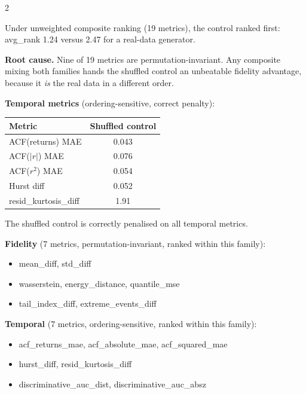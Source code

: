 \documentclass[10pt]{article}
\newcommand{\tealbox}[2]{\begin{tcolorbox}[mybox={Teal}{LBg},title={#1}]#2\end{tcolorbox}}
\begin{document}
\begin{multicols}{2}
{\smallskip
Under unweighted composite ranking (19 metrics), the control ranked first: avg\_rank 1.24 versus 2.47 for a real-data generator.

\textbf{Root cause.} Nine of 19 metrics are permutation-invariant. Any composite mixing both families hands the shuffled control an unbeatable fidelity advantage, because it \emph{is} the real data in a different order.

\textbf{Temporal metrics} (ordering-sensitive, correct penalty):
\begin{tabular}{@{}lc@{}}
\toprule
Metric & Shuffled control \\
\midrule
ACF(returns) MAE    & 0.043 \\
ACF($|r|$) MAE      & 0.076 \\
ACF($r^2$) MAE      & 0.054 \\
Hurst diff          & 0.052 \\
resid\_kurtosis\_diff & 1.91 \\
\bottomrule
\end{tabular}

The shuffled control is correctly penalised on all temporal metrics.}

\columnbreak

\tealbox{Metric Taxonomy}{%
\textbf{Fidelity} (7 metrics, permutation-invariant, ranked within this family):
\begin{itemize}[noitemsep,topsep=1pt]
  \item mean\_diff, std\_diff
  \item wasserstein, energy\_distance, quantile\_mse
  \item tail\_index\_diff, extreme\_events\_diff
\end{itemize}

\textbf{Temporal} (7 metrics, ordering-sensitive, ranked within this family):
\begin{itemize}[noitemsep,topsep=1pt]
  \item acf\_returns\_mae, acf\_absolute\_mae, acf\_squared\_mae
  \item hurst\_diff, resid\_kurtosis\_diff
  \item discriminative\_auc\_dist, discriminative\_auc\_absz
\end{itemize}

}
\end{multicols}
\end{document}
